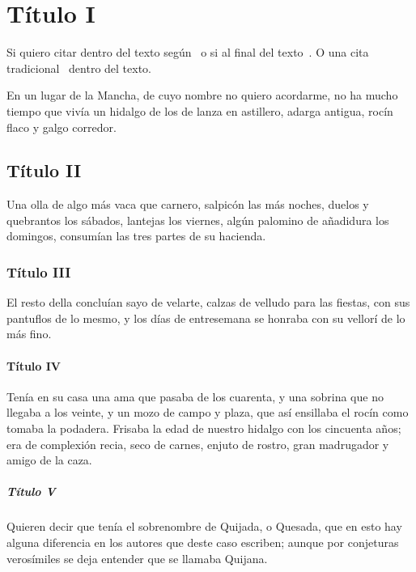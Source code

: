 \section{\large Título I}

Si quiero citar dentro del texto según~\textcite{cervantes1999} 
o si al final del texto~\parencite{cervantes1999}. O una cita tradicional~\cite{cervantes1999} dentro del texto.

En un lugar de la Mancha, de cuyo nombre no quiero acordarme, no ha mucho tiempo que vivía un hidalgo de los de lanza en astillero, adarga antigua, rocín flaco y galgo corredor.
\subsection{Título II} 
Una olla de algo más vaca que carnero, salpicón las más noches, duelos y quebrantos los sábados, lantejas los viernes, algún palomino de añadidura los domingos, consumían las tres partes de su hacienda. 

\subsubsection{Título III}
El resto della concluían sayo de velarte, calzas de velludo para las fiestas, con sus pantuflos de lo mesmo, y los días de entresemana se honraba con su vellorí de lo más fino.
\paragraph{Título IV}
Tenía en su casa una ama que pasaba de los cuarenta, y una sobrina que no llegaba a los veinte, y un mozo de campo y plaza, que así ensillaba el rocín como tomaba la podadera.
Frisaba la edad de nuestro hidalgo con los cincuenta años; era de complexión recia, seco de carnes, enjuto de rostro, gran madrugador y amigo de la caza. 
\subparagraph{Título V}
Quieren decir que tenía el sobrenombre de Quijada, o Quesada, que en esto hay alguna diferencia en los autores que deste caso escriben; aunque por conjeturas verosímiles se deja entender que se llamaba Quijana.

%

\lipsum[1] %

\lipsum[2-3] %


